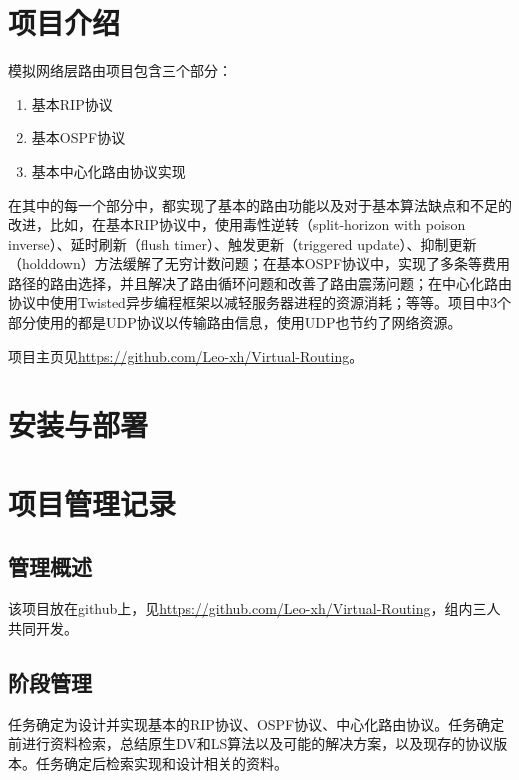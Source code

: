\documentclass[15pt]{ctexart}
\begin{document}

\tableofcontents
\newpage
\section{项目介绍} %
\label{sec:项目介绍}
	模拟网络层路由项目包含三个部分：
	\begin{enumerate}
		\item 基本RIP协议
		\item 基本OSPF协议
		\item 基本中心化路由协议实现
	\end{enumerate}
	\par 在其中的每一个部分中，都实现了基本的路由功能以及对于基本算法缺点和不足的改进，比如，在基本RIP协议中，使用毒性逆转（split-horizon with poison inverse）、延时刷新（flush timer）、触发更新（triggered update）、抑制更新（holddown）方法缓解了无穷计数问题；在基本OSPF协议中，实现了多条等费用路径的路由选择，并且解决了路由循环问题和改善了路由震荡问题；在中心化路由协议中使用Twisted异步编程框架以减轻服务器进程的资源消耗；等等。项目中3个部分使用的都是UDP协议以传输路由信息，使用UDP也节约了网络资源。
	\par 项目主页见\url{https://github.com/Leo-xh/Virtual-Routing}。




\section{安装与部署} %
\label{sec:安装与部署}


\section{项目管理记录} %
\label{sec:项目管理记录}
	\subsection{管理概述} %
	\label{sub:管理概述}
		该项目放在github上，见\url{https://github.com/Leo-xh/Virtual-Routing}，组内三人共同开发。
	\subsection{阶段管理} %
	\label{sub:阶段管理}
		任务确定为设计并实现基本的RIP协议、OSPF协议、中心化路由协议。任务确定前进行资料检索，总结原生DV和LS算法以及可能的解决方案，以及现存的协议版本。任务确定后检索实现和设计相关的资料。
\end{document}
